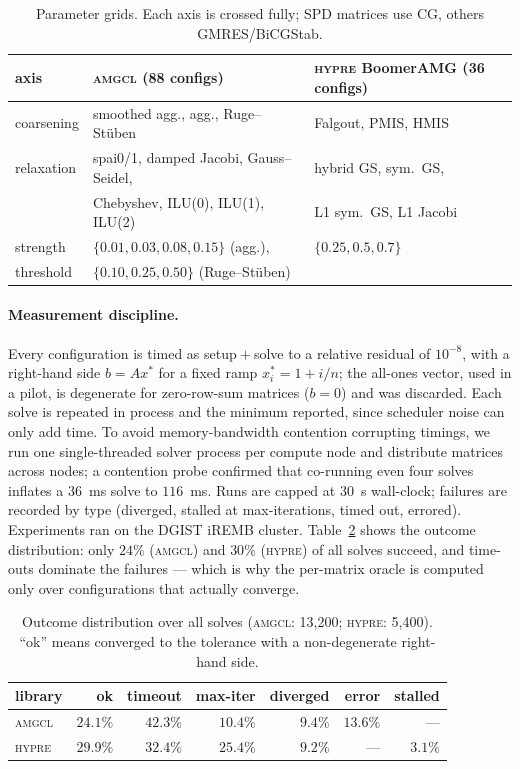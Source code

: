 \documentclass[acmsmall,screen,review]{acmart}
\newcommand{\amgcl}{\textsc{amgcl}}
\newcommand{\hypre}{\textsc{hypre}}
\begin{document}
\begin{table}[t]
\centering
\caption{Parameter grids. Each axis is crossed fully; SPD matrices use CG,
others GMRES/BiCGStab.}
\label{tab:grid}
\small
\begin{tabular}{@{}lll@{}}
\toprule
axis & \amgcl{} (88 configs) & \hypre{} BoomerAMG (36 configs) \\
\midrule
coarsening & smoothed agg., agg., Ruge--St\"uben & Falgout, PMIS, HMIS \\
relaxation & spai0/1, damped Jacobi, Gauss--Seidel, & hybrid GS, sym.\ GS, \\
           & Chebyshev, ILU(0), ILU(1), ILU(2) & L1 sym.\ GS, L1 Jacobi \\
strength   & $\{0.01,0.03,0.08,0.15\}$ (agg.), & $\{0.25, 0.5, 0.7\}$ \\
threshold  & $\{0.10,0.25,0.50\}$ (Ruge--St\"uben) & \\
\bottomrule
\end{tabular}
\end{table}

\paragraph{Measurement discipline.}
Every configuration is timed as setup${}+{}$solve to a relative residual of
$10^{-8}$, with a right-hand side $b = A x^\ast$ for a fixed ramp
$x^\ast_i = 1 + i/n$; the all-ones vector, used in a pilot, is degenerate for
zero-row-sum matrices ($b=0$) and was discarded. Each solve is repeated in
process and the minimum reported, since scheduler noise can only add time. To
avoid memory-bandwidth contention corrupting timings, we run one
single-threaded solver process per compute node and distribute matrices across
nodes; a contention probe confirmed that co-running even four solves inflates a
$36$~ms solve to $116$~ms. Runs are capped at 30~s wall-clock; failures are
recorded by type (diverged, stalled at max-iterations, timed out, errored).
Experiments ran on the DGIST iREMB cluster. Table~\ref{tab:status} shows the
outcome distribution: only $24\%$ (\amgcl{}) and $30\%$ (\hypre{}) of all
solves succeed, and time-outs dominate the failures --- which is why the
per-matrix oracle is computed only over configurations that actually converge.

\begin{table}[t]
\centering
\caption{Outcome distribution over all solves (\amgcl{}: 13{,}200; \hypre{}:
5{,}400). ``ok'' means converged to the tolerance with a non-degenerate
right-hand side.}
\label{tab:status}
\small
\begin{tabular}{@{}lrrrrrr@{}}
\toprule
library & ok & timeout & max-iter & diverged & error & stalled \\
\midrule
\amgcl{} & $24.1\%$ & $42.3\%$ & $10.4\%$ & $9.4\%$ & $13.6\%$ & --- \\
\hypre{} & $29.9\%$ & $32.4\%$ & $25.4\%$ & $9.2\%$ & --- & $3.1\%$ \\
\bottomrule
\end{tabular}
\end{table}
\end{document}
